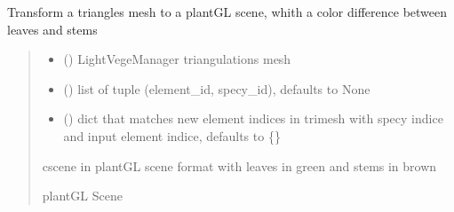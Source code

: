 \documentclass[letterpaper,10pt,english]{sphinxmanual}
\begin{document}
\begin{fulllineitems}
\label{\detokenize{reference:plantGL.cscene_to_plantGLScene_stems}}
\pysigstartsignatures
{}
\pysigstopsignatures
\sphinxAtStartPar
Transform a triangles mesh to a plantGL scene, whith a color difference between leaves and stems
\begin{quote}\begin{description}
\begin{itemize}
\item {} 
\sphinxAtStartPar
{} () \textendash{} LightVegeManager triangulations mesh

\item {} 
\sphinxAtStartPar
{} (\sphinxstyleliteralemphasis{\sphinxupquote{, }}) \textendash{} list of tuple (element\_id, specy\_id), defaults to None

\item {} 
\sphinxAtStartPar
{} (\sphinxstyleliteralemphasis{\sphinxupquote{, }}) \textendash{} dict that matches new element indices in trimesh with specy indice and
input element indice, defaults to \{\}

\end{itemize}

\sphinxAtStartPar
cscene in plantGL scene format with leaves in green and stems in brown

\sphinxAtStartPar
plantGL Scene

\end{description}\end{quote}

\end{fulllineitems}
\end{document}
